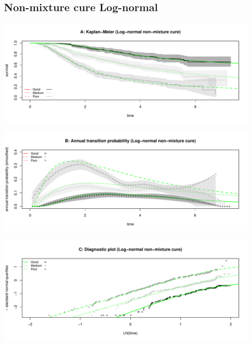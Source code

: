 \documentclass[]{article}
\begin{document}
\subsection{Non-mixture cure
Log-normal}\label{non-mixture-cure-log-normal}

\begin{flushleft}\includegraphics[height=0.25\textheight]{Images/cure_lnorm_nmix-1} \end{flushleft}

\begin{flushleft}\includegraphics[height=0.25\textheight]{Images/cure_lnorm_nmix-2} \end{flushleft}

\begin{flushleft}\includegraphics[height=0.25\textheight]{Images/cure_lnorm_nmix-3} \end{flushleft}

\newpage
\end{document}
